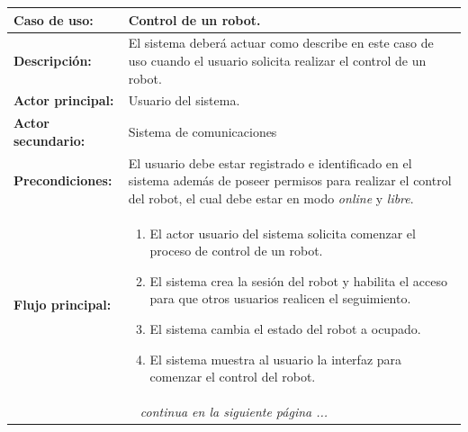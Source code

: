 \begin{table}[H]
  \begin{center}
    \begin{tabular}{|p{3.5cm}|p{10cm}|}
      \hline
      {\textbf{Caso de uso:}} & { Control de un robot.} \\
      \hline
      {\textbf{Descripción:}} & { El sistema deberá actuar como describe en este caso de uso cuando el usuario solicita realizar el control de un robot.} \\
     \hline
      {\textbf{Actor principal:}} & { Usuario del sistema.} \\
      \hline
      {\textbf{Actor secundario:}} & {     
	Sistema de comunicaciones
      } \\
      \hline
      {\textbf{Precondiciones:}} & { El usuario debe estar registrado e identificado en el sistema además de poseer permisos para realizar el control del robot, el cual debe estar en modo \emph{online} y \emph{libre}.} \\
     \hline   
    {\textbf{Flujo principal:}} & { 
      \begin{enumerate}
	\item El actor usuario del sistema solicita comenzar el proceso de control de un robot.
	\item El sistema crea la sesión del robot y habilita el acceso para que otros usuarios realicen el seguimiento.
	\item El sistema cambia el estado del robot a ocupado.
	\item El sistema muestra al usuario la interfaz para comenzar el control del robot.
      \end{enumerate}
      } \\
      \hline
     \multicolumn{2}{c}{\emph{continua en la siguiente página ...}}\\
    \end{tabular}
  \end{center}
\end{table}    


